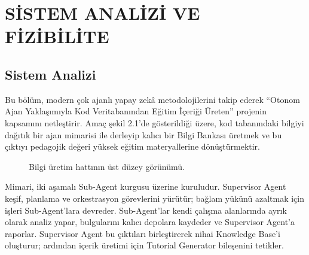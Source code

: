 \chapter{SİSTEM ANALİZİ VE FİZİBİLİTE}
\section{Sistem Analizi}
\label{sec:sistem-analizi}

Bu bölüm, modern çok ajanlı yapay zekâ metodolojilerini takip ederek ``Otonom Ajan Yaklaşımıyla Kod Veritabanından Eğitim İçeriği Üreten'' projenin kapsamını netleştirir. Amaç şekil 2.1'de gösterildiği üzere, kod tabanındaki bilgiyi dağıtık bir ajan mimarisi ile derleyip kalıcı bir Bilgi Bankası üretmek ve bu çıktıyı pedagojik değeri yüksek eğitim materyallerine dönüştürmektir.

\begin{figure}[htbp]
    \centering
    \caption{Bilgi üretim hattının üst düzey görünümü.}
    \label{fig:pipeline-overview}
\end{figure}

Mimari, iki aşamalı Sub-Agent kurgusu üzerine kuruludur. Supervisor Agent keşif, planlama ve orkestrasyon görevlerini yürütür; bağlam yükünü azaltmak için işleri Sub-Agent'lara devreder. Sub-Agent'lar kendi çalışma alanlarında ayrık olarak analiz yapar, bulgularını kalıcı depolara kaydeder ve Supervisor Agent’a raporlar. Supervisor Agent bu çıktıları birleştirerek nihai Knowledge Base'i oluşturur; ardından içerik üretimi için Tutorial Generator bileşenini tetikler.

